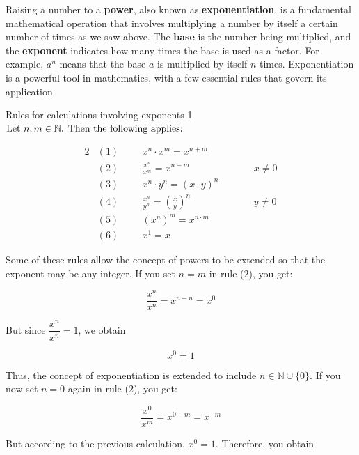 Raising a number to a \textbf{power}, also known as \textbf{exponentiation}, is a fundamental mathematical operation that involves multiplying a number by itself a certain number of times as we saw above. The \textbf{base} is the number being multiplied, and the \textbf{exponent} indicates how many times the base is used as a factor. For example, \(a^n\) means that the base \(a\) is multiplied by itself \(n\) times. Exponentiation is a powerful tool in mathematics, with a few essential rules that govern its application.
\begin{custombox}{Rules for calculations involving exponents 1}
\label{def:DefPow}
$\textnormal{Let } n,m \in \mathbb{N}\textnormal{. Then the following applies:}$
\begin{fleqn}
\begin{alignat*}{2}
&(1) \hspace{1cm} x^n \cdot x^m=x^{n+m}  \\
&(2) \hspace{1cm} \frac{x^n}{x^m}=x^{n-m}   &\qquad&   x \neq 0  \\
&(3) \hspace{1cm} x^n \cdot y^n=(x \cdot y)^n \\
&(4) \hspace{1cm} \frac{x^n}{y^n}=\left(\frac{x}{y}\right)^n &\qquad& y \neq 0 \\
&(5) \hspace{1cm} \left(x^n\right)^m=x^{n \cdot m}\\
&(6) \hspace{1cm} x^1=x
\end{alignat*}
\end{fleqn}
\end{custombox}

Some of these rules allow the concept of powers to be extended so that the exponent may be any integer. If you set \(n = m\) in rule (2), you get:

\[
\frac{x^n}{x^n} = x^{n-n} = x^0
\]

But since \(\dfrac{x^n}{x^n} = 1\), we obtain

\[
x^0 = 1
\]

Thus, the concept of exponentiation is extended to include \(n \in \mathbb{N} \cup \{0\}\). If you now set \(n = 0\) again in rule (2), you get:

\[
\frac{x^0}{x^m} = x^{0-m} = x^{-m}
\]

But according to the previous calculation, \(x^0 = 1\). Therefore, you obtain

